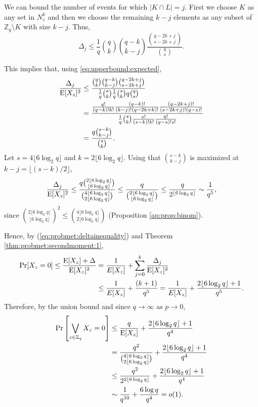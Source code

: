 We can bound the number of events for which $|K \cap L| = j$. First we choose $K$ as any set in $N_z^k$ and then we choose the remaining $k- j$ elements as any subset of $\mathbb{Z}_q \setminus K$ with size $k - j$. Thus, 
\[\Delta_j \leq \frac{1}{q}\binom{q}{k}\binom{q - k}{k - j} \frac{\binom{q - 2k + j}{s - 2k + j}}{\binom{q}{s}}.\]
\par This implies that, using \ref{eq:upperbound:expected},
\begin{align*}
    \frac{\Delta_j}{\mathrm{E}[X_z]^2} &\leq \frac{\binom{q}{k} \binom{q - k}{k - j}\binom{q - 2k + j}{s - 2k + j}}{\frac{1}{q} \binom{s}{k}\frac{1}{q} \binom{s}{k}q\binom{q}{s}} \\
    &= \frac{\frac{q!}{(q - k)!k!}\frac{(q - k)!}{(k - j)!(q - 2k + k)!}\frac{(q - 2k + j)!}{(s - 2k + j)!(q - s)!}}{\frac{1}{q}\binom{s}{k}\frac{s!}{(s - k)!k!}\frac{q!}{(q - s)!s!}} \\
    &= \frac{q\binom{s - k}{k - j}}{\binom{s}{k}}.
\end{align*}
Let $s = 4\lfloor 6 \log_2 q \rfloor$ and $k = 2\lfloor 6 \log_2 q \rfloor$. Using that $\binom{s - k}{k - j}$ is maximized at $k - j = \lfloor (s - k) / 2\rfloor$,
\begin{align*}
\frac{\Delta_j}{\mathrm{E}[X_z]^2} \leq \frac{q \binom{2\lfloor 6 \log_2 q \rfloor}{\lfloor 6 \log_2 q \rfloor}}{\binom{4\lfloor 6 \log_2 q \rfloor}{2\lfloor 6 \log_2 q \rfloor}} \leq \frac{q}{\binom{2\lfloor 6 \log_2 q \rfloor }{ \lfloor 6 \log_2 q \rfloor}} \leq \frac{q}{2^{\lfloor 6 \log_2 q \rfloor}} \sim \frac{1}{q^5},
\end{align*}
since \(\binom{2\lfloor 6 \log_2 q \rfloor}{\lfloor 6 \log_2 q \rfloor}^2 \leq \binom{4\lfloor 6 \log_2 q \rfloor }{2\lfloor 6 \log_2 q \rfloor}\) (Proposition \ref{ap:prop:binom}).   \par
Hence, by (\ref{eq:probmet:deltainequality}) and Theorem \ref{thm:probmet:secondmoment:1},
\begin{align*}
\mathrm{Pr}[X_z = 0] \leq \frac{\mathrm{E}[X_z] + \Delta}{\mathrm{E}[X_z]^2} &= \frac{1}{E[X_z]} + \sum_{j = 0}^k \frac{\Delta_j}{\mathrm{E}[X_z]^2} \\
&\leq \frac{1}{E[X_z]} + \frac{(k + 1)}{q^5} = \frac{1}{E[X_z]} + \frac{2\lfloor 6 \log_2 q\rfloor + 1}{q^5}.
\end{align*}
Therefore, by the union bound and since $q \to \infty$ as $p \to 0$,
\begin{align}
\mathrm{Pr}\left[\bigvee_{z \in \mathbb{Z}_q} X_z = 0\right] &\leq \frac{q}{\mathrm{E}[X_z]} + \frac{2\lfloor 6 \log_2 q \rfloor + 1}{q^4}\\
 &= \frac{q^2}{\binom{4\lfloor 6 \log_2 q \rfloor}{2\lfloor 6 \log_2 q \rfloor}} + \frac{2\lfloor 6 \log_2 q \rfloor + 1}{q^4} \\
 &\leq \frac{q^2}{2^{2\lfloor 6 \log_2 q \rfloor}} + \frac{2\lfloor 6 \log_2 q \rfloor + 1}{q^4} \\
 &\sim \frac{1}{q^{10}} + \frac{6\log q}{q^4}= o(1).\label{eq:lemma:prob}
\end{align}
